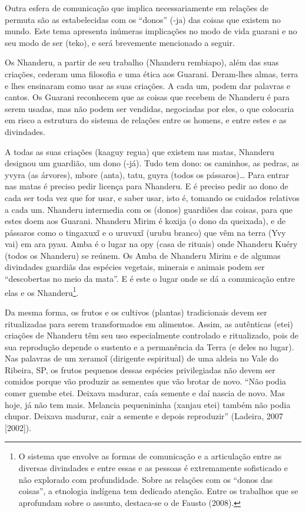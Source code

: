 Outra esfera de comunicação que implica necessariamente em relações de
permuta são as estabelecidas com os ``donos'' (-ja) das coisas que
existem no mundo. Este tema apresenta inúmeras implicações no modo de
vida guarani e no seu modo de ser (teko), e será brevemente mencionado
a seguir.  

Os Nhanderu, a partir de seu trabalho (Nhanderu rembiapo), além das suas
criações, cederam uma filosofia e uma ética aos Guarani. Deram-lhes
almas, terra e lhes ensinaram como usar as suas criações. A cada um,
podem dar palavras e cantos. Os Guarani reconhecem que as coisas que
recebem de Nhanderu é para serem usadas, mas não podem ser vendidas,
negociadas por eles, o que colocaria em risco a estrutura do sistema de
relações entre os homens, e entre estes e as divindades. 

A todas as suas criações (kaaguy regua) que existem nas matas, Nhanderu
designou um guardião, um dono (-já). Tudo tem dono: os caminhos, as
pedras, as yvyra (as árvores), mbore (anta), tatu, guyra (todos os
pássaros)\ldots{} Para entrar nas matas é preciso pedir licença para
Nhanderu. E é preciso pedir ao dono de cada ser toda vez que for usar,
e saber usar, isto é, tomando os cuidados relativos a cada um. Nhanderu
intermedia com os (donos) guardiões das coisas, para que estes doem aos
Guarani.  Nhanderu Mirim é koxija (o dono da queixada), e de pássaros
como o tingaxuxĩ e o
uruvuxĩ (urubu branco) que vêm na terra (Yvy vai)
em ara pyau. Amba é o lugar na opy (casa de rituais) onde Nhanderu
Kuéry (todos os Nhanderu) se reúnem. Os Amba de Nhanderu Mirim e de
algumas divindades guardiãs das espécies vegetais, minerais e animais
podem ser ``descobertas no meio da mata''. E é este o lugar onde se dá a
comunicação entre elas e os Nhanderu\footnote{O sistema que envolve as
formas de comunicação e a articulação entre as diversas divindades e
entre essas e as pessoas é extremamente sofisticado e não explorado com
profundidade. Sobre as relações com os ``donos das coisas'', a etnologia
indígena tem dedicado atenção. Entre os trabalhos que se aprofundam
sobre o assunto, destaca-se o de Fausto (2008). }. 

Da mesma forma, os frutos e os cultivos (plantas) tradicionais devem ser
ritualizadas para serem transformados em alimentos. Assim, as
autênticas (etei) criações de Nhanderu têm seu uso especialmente
controlado e ritualizado, pois de sua reprodução depende o sustento e a
permanência da Terra (e deles no lugar). Nas palavras de um
xeramoĩ (dirigente espiritual) de uma aldeia no
Vale do Ribeira, SP, os frutos pequenos dessas espécies privilegiadas
não devem ser comidos porque vão produzir as sementes que vão brotar de
novo. ``Não podia comer guembe etei. Deixava madurar, caía semente e daí
nascia de novo. Mas hoje, já não tem mais. Melancia pequenininha
(xanjau etei) também não podia chupar. Deixava madurar, cair a semente
e depois reproduzir'' (Ladeira, 2007 [2002]).

